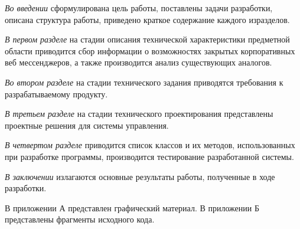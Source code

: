 \textit{Во введении} сформулирована цель работы, поставлены задачи разработки, описана структура работы, приведено краткое содержание каждого изразделов.

\textit{В первом разделе} на стадии описания технической характеристики предметной области приводится сбор информации о возможностях закрытых корпоративных веб мессенджеров, а также производится анализ существующих аналогов.

\textit{Во втором разделе} на стадии технического задания приводятся требования к разрабатываемому продукту.

\textit{В третьем разделе} на стадии технического проектирования представлены проектные решения для системы управления.

\textit{В четвертом разделе} приводится список классов и их методов, использованных при разработке программы, производится тестирование разработанной системы.

\textit{В заключении} излагаются основные результаты работы, полученные в ходе разработки.

В приложении А представлен графический материал. В приложении Б представлены фрагменты исходного кода.